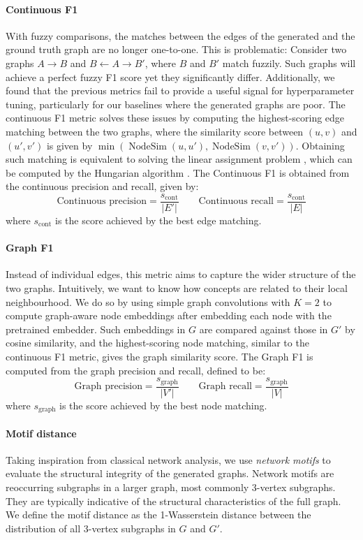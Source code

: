 \documentclass{article}
\DeclareMathOperator{\nodesim}{NodeSim}
\begin{document}
\paragraph{Continuous F1}
With fuzzy comparisons, the matches between the edges of the generated and the ground truth graph are no longer one-to-one. This is problematic: Consider two graphs $A \rightarrow B$ and $B \leftarrow A \rightarrow B'$, where $B$ and $B'$ match fuzzily. Such graphs will achieve a perfect fuzzy F1 score yet they significantly differ. Additionally, we found that the previous metrics fail to provide a useful signal for hyperparameter tuning, particularly for our baselines where the generated graphs are poor. The continuous F1 metric solves these issues by computing the highest-scoring edge matching between the two graphs, where the similarity score between $(u, v)$ and $(u', v')$ is given by $\min(\nodesim(u, u'), \nodesim(v, v'))$. Obtaining such matching is equivalent to solving the linear assignment problem \cite{martello1987linear}, which can be computed by the Hungarian algorithm \cite{kuhn1955hungarian}. The Continuous F1 is obtained from the continuous precision and recall, given by:
\[
    \text{Continuous precision} = \frac{s_\text{cont}}{|E'|} \qquad
    \text{Continuous recall} = \frac{s_\text{cont}}{|E|}
\]
where $s_\text{cont}$ is the score achieved by the best edge matching.

\paragraph{Graph F1}
Instead of individual edges, this metric aims to capture the wider structure of the two graphs. Intuitively, we want to know how concepts are related to their local neighbourhood. We do so by using simple graph convolutions \cite{wu2019simplifying} with $K=2$ to compute graph-aware node embeddings after embedding each node with the pretrained embedder. Such embeddings in $G$ are compared against those in $G'$ by cosine similarity, and the highest-scoring node matching, similar to the continuous F1 metric, gives the graph similarity score. The Graph F1 is computed from the graph precision and recall, defined to be:
\[
    \text{Graph precision} = \frac{s_\text{graph}}{|V'|} \qquad
    \text{Graph recall} = \frac{s_\text{graph}}{|V|}
\]
where $s_\text{graph}$ is the score achieved by the best node matching.

\paragraph{Motif distance}
Taking inspiration from classical network analysis, we use \emph{network motifs} \cite{milo2002network,shen2002network} to evaluate the structural integrity of the generated graphs. Network motifs are reoccurring subgraphs in a larger graph, most commonly 3-vertex subgraphs. They are typically indicative of the structural characteristics of the full graph. We define the motif distance as the 1-Wasserstein distance between the distribution of all 3-vertex subgraphs in $G$ and $G'$.
\end{document}

